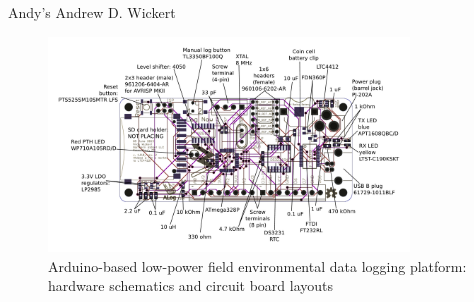 \documentclass{beamer}
\begin{document}
\begin{frame}{Andy's Andrew D. Wickert}
\begin{figure}
\centering
\includegraphics[height=5.7cm]{graphics/ALog_drawing.PDF}
\caption{Arduino-based low-power field environmental data logging platform: hardware schematics and circuit board layouts\cite{ALog-BottleLogger}}
\end{figure}
\end{frame}
\end{document}
